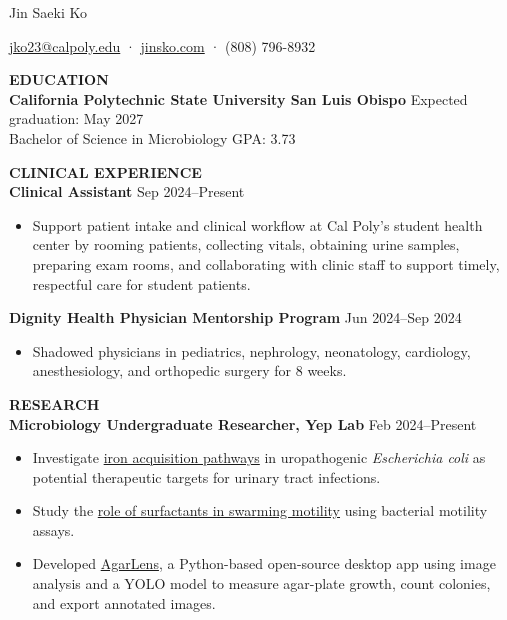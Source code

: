 \documentclass[10pt]{article}
\begin{document}
\begin{center}
{\huge Jin Saeki Ko}

\href{mailto:jko23@calpoly.edu}{jko23@calpoly.edu} ·
\href{https://jinsko.com/}{jinsko.com} ·
(808) 796-8932
\end{center}

\textbf{EDUCATION}
\hrulefill\\
\textbf{California Polytechnic State University San Luis Obispo}
\hfill
Expected graduation: May 2027\\
Bachelor of Science in Microbiology
\hfill
GPA: 3.73

\textbf{CLINICAL EXPERIENCE}
\hrulefill\\
\textbf{Clinical Assistant}
\hfill
Sep 2024--Present
\begin{itemize}
  \item Support patient intake and clinical workflow at Cal Poly's student health center by rooming patients, collecting vitals, obtaining urine samples, preparing exam rooms, and collaborating with clinic staff to support timely, respectful care for student patients.
\end{itemize}

\textbf{Dignity Health Physician Mentorship Program}
\hfill
Jun 2024--Sep 2024
\begin{itemize}
  \item Shadowed physicians in pediatrics, nephrology, neonatology, cardiology, anesthesiology, and orthopedic surgery for 8 weeks.
\end{itemize}

\textbf{RESEARCH}
\hrulefill\\
\textbf{Microbiology Undergraduate Researcher, Yep Lab}
\hfill
Feb 2024--Present
\begin{itemize}
  \item Investigate \href{https://jinsko.com/research/8-17-2025.html}{iron acquisition pathways} in uropathogenic \textit{Escherichia coli} as potential therapeutic targets for urinary tract infections.
  \item Study the \href{https://jinsko.com/research/9-17-2025.html}{role of surfactants in swarming motility} using bacterial motility assays.
  \item Developed \href{https://jinsko.com/research/colony_counter/}{AgarLens}, a Python-based open-source desktop app using image analysis and a YOLO model to measure agar-plate growth, count colonies, and export annotated images.
\end{itemize}
\end{document}
